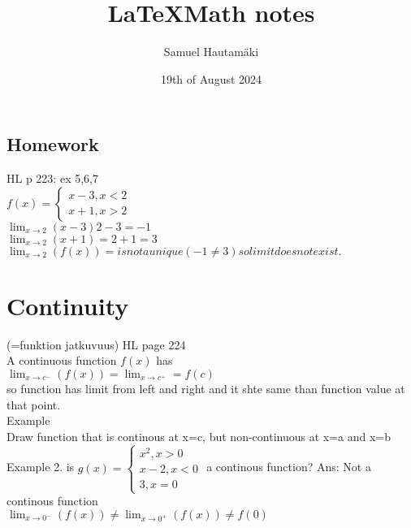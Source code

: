 \documentclass{article}
\title{\LaTeX Math notes}
\author{Samuel Hautamäki}
\date{19th of August 2024}
\begin{document}
  \maketitle
  
  \subsection{Homework}
  HL p 223: ex 5,6,7\\
  $f(x)=\begin{cases}
    x-3,x<2\\
    x+1,x>2
  \end{cases}$\\
  $\lim_{x\to 2}(x-3)2-3=-1$\\
  $\lim_{x\to 2}(x+1)=2+1=3$
  $\lim_{x\to 2}(f(x))= is not a unique (-1\neq3) so limit does not exist.$

  \section{Continuity}
  (=funktion jatkuvuus)
  HL page 224\\
  A continuous function $f(x)$ has\\
  $\lim_{x\to c^-}(f(x))=\lim_{x\to c^+}=f(c)$\\
  so function has limit from left and right and it shte same than function value at that point.\\
  Example\\
  Draw function that is continous at x=c, but non-continuous at x=a and x=b\\
  Example 2. is $g(x)=\begin{cases}
    x^2,x>0\\
    x-2,x<0\\
    3, x=0
  \end{cases}$ a continous function?
  Ans: Not a continous function\\
  $\lim_{x\to 0^-}(f(x))\neq\lim_{x\to 0^+}(f(x))\neq f(0)$\\
\end{document}
